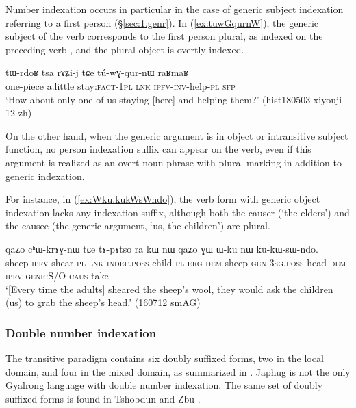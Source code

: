 Number indexation occurs in particular in the case of generic subject indexation referring to a first person (§\ref{sec:1.genr}). In (\ref{ex:tuwGqurnW}), the generic subject of the verb  corresponds to the first person plural, as indexed on the preceding verb , and the plural object is overtly indexed.

\begin{exe}
\ex \label{ex:tuwGqurnW}
\gll tɯ-rdoʁ tsa rɤʑi-j tɕe tú-wɣ-qur-nɯ raʁmaʁ \\
one-piece a.little stay:\textsc{fact}-\textsc{1pl} \textsc{lnk} \textsc{ipfv}-\textsc{inv}-help-\textsc{pl} \textsc{sfp} \\
\glt `How about only one of us staying [here] and helping them?' (hist180503 xiyouji 12-zh)
\end{exe}

On the other hand, when the generic argument is in object or intransitive subject function, no person indexation suffix can appear on the verb, even if this argument is realized as an overt noun phrase with plural marking in addition to generic indexation.

For instance, in (\ref{ex:Wku.kukWsWndo}), the verb form with generic object indexation  lacks any indexation suffix, although both the causer (`the elders') and the causee (the generic argument,  `us, the children') are plural.

\begin{exe}
\ex \label{ex:Wku.kukWsWndo}
\gll qaʑo cʰɯ-krɤɣ-nɯ tɕe tɤ-pɤtso ra kɯ nɯ qaʑo ɣɯ ɯ-ku nɯ ku-kɯ-sɯ-ndo. \\
sheep \textsc{ipfv}-shear-\textsc{pl} \textsc{lnk} \textsc{indef}.\textsc{poss}-child \textsc{pl} \textsc{erg} \textsc{dem} sheep \textsc{gen} \textsc{3sg}.\textsc{poss}-head \textsc{dem} \textsc{ipfv}-\textsc{genr}:S/O-\textsc{caus}-take \\
\glt `[Every time the adults] sheared the sheep's wool, they would ask the children (us) to grab the sheep's head.' (160712 smAG)
\end{exe}

\subsubsection{Double number indexation}  \label{sec:double.number.indexation}
The transitive paradigm contains six doubly suffixed forms, two in the local domain, and four in the mixed domain, as summarized in . Japhug is not the only Gyalrong language with double number indexation. The same set of doubly suffixed forms is found in Tshobdun \citep{jackson02rentongdengdi} and Zbu \citep{gongxun14agreement}.

